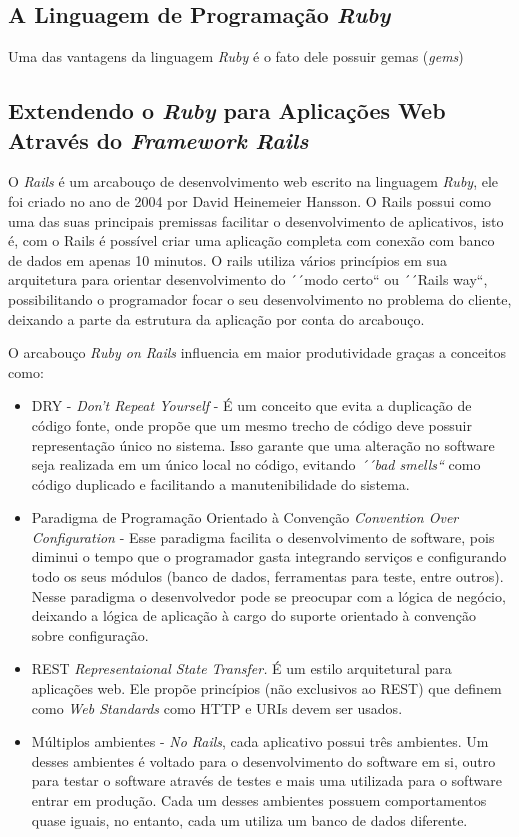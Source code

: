 \subsection{A Linguagem de Programação \textit{Ruby}}
\label{sec:linguagemruby}

Uma das vantagens da linguagem \textit{Ruby} é o fato dele possuir gemas (\textit{gems})

\subsection{Extendendo o \textit{Ruby} para Aplicações Web Através do \textit{Framework Rails}}
\label{sub:frameworkrails}

O \textit{Rails} é um arcabouço de desenvolvimento web escrito na linguagem \textit{Ruby}, ele foi criado no ano de 2004 por David Heinemeier Hansson. O Rails possui como uma das suas principais premissas facilitar o desenvolvimento de aplicativos, isto é, com o Rails é possível criar uma aplicação completa com conexão com banco de dados em apenas 10 minutos. O rails utiliza vários princípios em sua arquitetura para orientar desenvolvimento do ´´modo certo`` ou ´´Rails way``, possibilitando o programador focar o seu desenvolvimento no problema do cliente, deixando a parte da estrutura da aplicação por conta do arcabouço. %

O arcabouço \textit{Ruby on Rails} influencia em maior produtividade graças a conceitos como:

\begin{itemize}
\item DRY - \textit{Don’t Repeat Yourself} - É um conceito que evita a duplicação de código fonte, onde propõe que um mesmo trecho de código deve possuir representação único no sistema. Isso garante que uma alteração no software seja realizada em um único local no código, evitando  \textit{´´bad smells``} como código duplicado e facilitando a manutenibilidade do sistema.
\item Paradigma de Programação Orientado à Convenção \textit{Convention Over Configuration} - Esse paradigma facilita o desenvolvimento de software, pois diminui o tempo que o programador gasta integrando serviços e configurando todo os seus módulos (banco de dados, ferramentas para teste, entre outros). Nesse paradigma o desenvolvedor pode se preocupar com a lógica de negócio, deixando a lógica de aplicação à cargo do suporte orientado à convenção sobre configuração.
\item REST \textit{Representaional State Transfer.} É um estilo arquitetural para aplicações web. Ele propõe princípios (não exclusivos ao REST) que definem
como \textit{Web Standards} como HTTP e URIs devem ser usados.
\item Múltiplos ambientes - \textit{No Rails}, cada aplicativo possui três ambientes. Um desses ambientes é voltado para o desenvolvimento do software em si, outro para testar o software através de testes e mais uma utilizada para o software entrar em produção. Cada um desses ambientes possuem comportamentos quase iguais, no entanto, cada um utiliza um banco de dados diferente.
\end{itemize}


